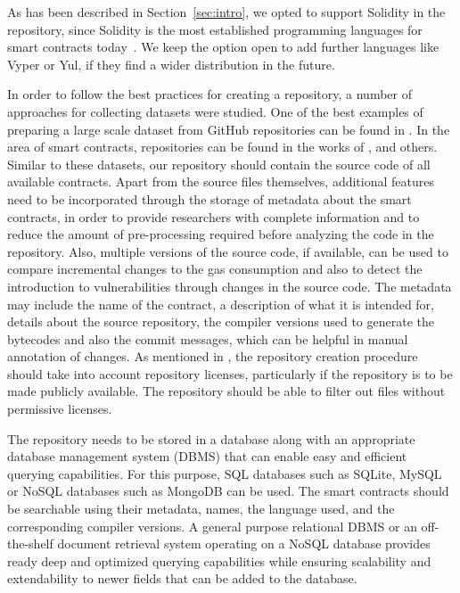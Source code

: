 \documentclass[10pt,conference]{IEEEtran}
\begin{document}
	As has been described in Section~\ref{sec:intro}, we opted to support Solidity in the repository, since Solidity is the most established programming languages for smart contracts today~\cite{soliditycheck}. We keep the option open to add further languages like Vyper or Yul, if they find a wider distribution in the future. 
	
	In order to follow the best practices for creating a repository, a number of approaches for collecting datasets were studied. One of the best examples of preparing a large scale dataset from GitHub repositories can be found in \cite{thestack}. In the area of smart contracts, repositories can be found in the works of \cite{ren}, \cite{ferreirarepo} and others. Similar to these datasets, our repository should contain the source code of all available contracts. Apart from the source files themselves, additional features need to be incorporated through the storage of metadata about the smart contracts, in order to provide researchers with complete information and to reduce the amount of pre-processing required before analyzing the code in the repository. Also, multiple versions of the source code, if available, can be used to compare incremental changes to the gas consumption and also to detect the introduction to vulnerabilities through changes in the source code. The metadata may include the name of the contract, a description of what it is intended for, details about the source repository, the compiler versions used to generate the bytecodes and also the commit messages, which can be helpful in manual annotation of changes. As mentioned in \cite{thestack}, the repository creation procedure should take into account repository licenses, particularly if the repository is to be made publicly available. The repository should be able to filter out files without permissive licenses.
	
	The repository needs to be stored in a database along with an appropriate database management system (DBMS) that can enable easy and efficient querying capabilities. For this purpose, SQL databases such as SQLite, MySQL or NoSQL databases such as MongoDB can be used.  The smart contracts should be searchable using their metadata, names, the language used, and the corresponding compiler versions. A general purpose relational DBMS or an off-the-shelf document retrieval system operating on a NoSQL database provides ready deep and optimized querying capabilities while ensuring scalability and extendability to newer fields that can be added to the database.
	
\end{document}
